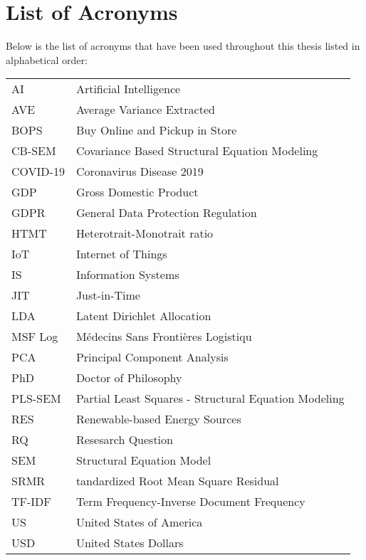 
\thispagestyle{plain}			%
\chapter*{List of Acronyms}
Below is the list of acronyms that have been used throughout this thesis listed in alphabetical order:
\vspace*{1.0cm}

\begin{tabular}{p{3cm}p{12cm}}
AI & Artificial Intelligence \\
AVE & Average Variance Extracted \\
BOPS & Buy Online and Pickup in Store \\
CB-SEM & Covariance Based Structural Equation Modeling \\
COVID-19 & Coronavirus Disease 2019 \\
GDP & Gross Domestic Product \\
GDPR & General Data Protection Regulation \\
HTMT & Heterotrait-Monotrait ratio \\
IoT & Internet of Things \\
IS & Information Systems \\
JIT & Just-in-Time \\
LDA & Latent Dirichlet Allocation \\
MSF Log & Médecins Sans Frontières Logistiqu \\
PCA & Principal Component Analysis \\
PhD & Doctor of Philosophy \\
PLS-SEM & Partial Least Squares - Structural Equation Modeling \\
RES & Renewable-based Energy Sources\\
RQ & Resesarch Question \\
SEM & Structural Equation Model \\
SRMR & tandardized Root Mean Square Residual \\
TF-IDF & Term Frequency-Inverse Document Frequency \\
US & United States of America \\
USD & United States Dollars \\
\end{tabular}


\thispagestyle{empty}
\mbox{}

